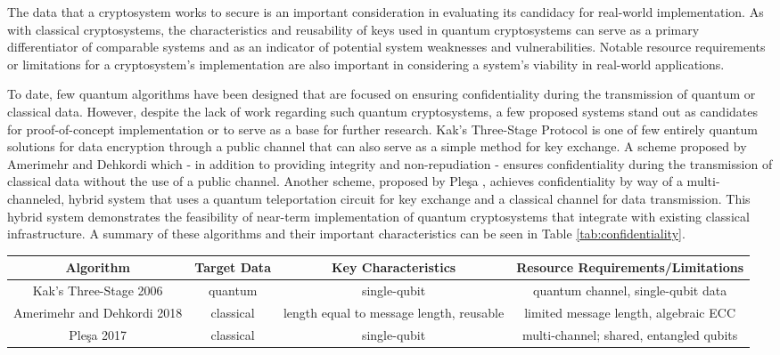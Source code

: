 \documentclass[sigconf]{acmart}
\begin{document}
The data that a cryptosystem works to secure is an important consideration in evaluating its candidacy for real-world implementation. As with classical cryptosystems, the characteristics and reusability of keys used in quantum cryptosystems can serve as a primary differentiator of comparable systems and as an indicator of potential system weaknesses and vulnerabilities. Notable resource requirements or limitations for a cryptosystem's implementation are also important in considering a system's viability in real-world applications.

To date, few quantum algorithms have been designed that are focused on ensuring confidentiality during the transmission of quantum or classical data. However, despite the lack of work regarding such quantum cryptosystems, a few proposed systems stand out as candidates for proof-of-concept implementation or to serve as a base for further research. Kak's Three-Stage Protocol \cite{kak_three-stage_2006} is one of few entirely quantum solutions for data encryption through a public channel that can also serve as a simple method for key exchange. A scheme proposed by Amerimehr and Dehkordi \cite{amerimehr_quantum_2018} which - in addition to providing integrity and non-repudiation - ensures confidentiality during the transmission of classical data without the use of a public channel. Another scheme, proposed by Pleşa \cite{plesa_hybrid_2017}, achieves confidentiality by way of a multi-channeled, hybrid system that uses a quantum teleportation circuit for key exchange and a classical channel for data transmission. This hybrid system demonstrates the feasibility of near-term implementation of quantum cryptosystems that integrate with existing classical infrastructure. A summary of these algorithms and their important characteristics can be seen in Table \ref{tab:confidentiality}.

\begin{table*}[ht]
\caption{Classification of Quantum Confidentiality Algorithms}
\label{tab:confidentiality}
\begin{tabular}{ |c|c|c|c| }
\hline
\textbf{Algorithm} & \textbf{Target Data} & \textbf{Key Characteristics} & \textbf{Resource Requirements/Limitations} \\
\hline
Kak's Three-Stage 2006 & quantum & single-qubit & quantum channel, single-qubit data \\ 
\hline
Amerimehr and Dehkordi 2018 & classical & length equal to message length, reusable & limited message length, algebraic ECC \\ 
\hline
Pleşa 2017 & classical & single-qubit & multi-channel; shared, entangled qubits \\ 
\hline
\end{tabular}
\end{table*}
\end{document}
